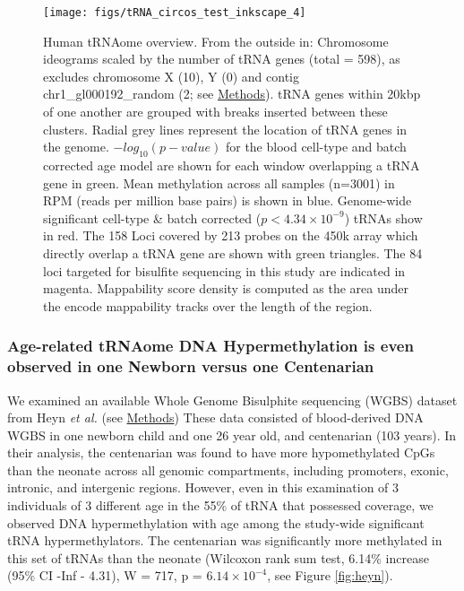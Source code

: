 \documentclass[
]{book}
\begin{document}
\begin{figure}

{\centering \texttt{[image: figs/tRNA\_circos\_test\_inkscape\_4]} 

}

\caption{Human tRNAome overview. From the outside in: Chromosome ideograms scaled by the number of tRNA genes (total = 598), as excludes chromosome X (10), Y (0) and contig chr1\_gl000192\_random (2; see \protect\hyperlink{tRNAanno}{Methods}). tRNA genes within 20kbp of one another are grouped with breaks inserted between these clusters. Radial grey lines represent the location of tRNA genes in the genome. \(-log_{10}(p-value)\) for the blood cell-type and batch corrected age model are shown for each window overlapping a tRNA gene in green. Mean methylation across all samples (n=3001) in RPM (reads per million base pairs) is shown in blue. Genome-wide significant cell-type \& batch corrected (\(p < 4.34\times10^{-9}\)) tRNAs show in red. The 158 Loci covered by 213 probes on the 450k array which directly overlap a tRNA gene are shown with green triangles. The 84 loci targeted for bisulfite sequencing in this study are indicated in magenta. Mappability score density is computed as the area under the encode mappability tracks \citep{Derrien2012} over the length of the region.}\label{fig:circos}
\end{figure}



\newpage

\hypertarget{age-related-trnaome-dna-hypermethylation-is-even-observed-in-one-newborn-versus-one-centenarian}{%
\subsubsection{Age-related tRNAome DNA Hypermethylation is even observed in one Newborn versus one Centenarian}\label{age-related-trnaome-dna-hypermethylation-is-even-observed-in-one-newborn-versus-one-centenarian}}

We examined an available Whole Genome Bisulphite sequencing (WGBS) dataset from Heyn \emph{et al.} \citep{Heyn2012} (see \protect\hyperlink{Methods}{Methods})
These data consisted of blood-derived DNA WGBS in one newborn child and one 26 year old, and centenarian (103 years).
In their analysis, the centenarian was found to have more hypomethylated CpGs than the neonate across all genomic compartments, including promoters, exonic, intronic, and intergenic regions.
However, even in this examination of 3 individuals of 3 different age in the 55\% of tRNA that possessed coverage, we observed DNA hypermethylation with age among the study-wide significant tRNA hypermethylators. The centenarian was significantly more methylated in this set of tRNAs than the neonate (Wilcoxon rank sum test, 6.14\% increase (95\% CI -Inf - 4.31), W = 717, p = \(6.14\times10^{-4}\), see Figure \ref{fig:heyn}).
\end{document}
